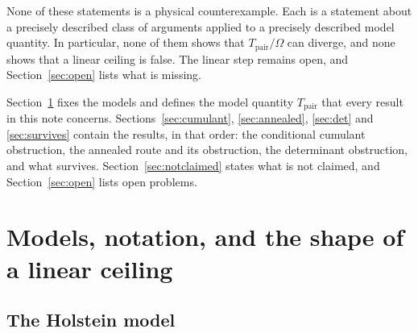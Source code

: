 \documentclass[11pt]{article}
\theoremstyle{definition}
\theoremstyle{remark}
\newcommand{\pair}{\mathrm{pair}}
\newcommand{\Tpair}{T_{\pair}}
\begin{document}
None of these statements is a physical counterexample. Each is a statement about a
precisely described class of arguments applied to a precisely described model
quantity. In particular, none of them shows that $\Tpair/\Omega$ can diverge, and
none shows that a linear ceiling is false. The linear step remains open, and
Section~\ref{sec:open} lists what is missing.

Section~\ref{sec:model} fixes the models and defines the model quantity
$\Tpair$ that every result in this note concerns. Sections~\ref{sec:cumulant},
\ref{sec:annealed}, \ref{sec:det} and \ref{sec:survives} contain the results, in that
order: the conditional cumulant obstruction, the annealed route and its obstruction,
the determinant obstruction, and what survives.
Section~\ref{sec:notclaimed} states what is not claimed, and
Section~\ref{sec:open} lists open problems.

\section{Models, notation, and the shape of a linear ceiling}
\label{sec:model}

\subsection{The Holstein model}
\end{document}
